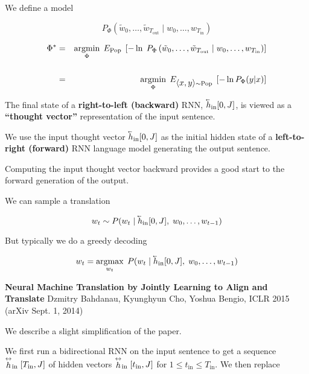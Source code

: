 {

\vfill
We define a model

\vfill
$$P_\Phi\left(\tilde{w}_0,\ldots,\tilde{w}_{T_{\mathrm{out}}}\;|\; w_0,\ldots,w_{T_{\mathrm{in}}}\right)$$

\vfill
\begin{eqnarray*}
\Phi^*  & = & \operatorname*{argmin}_\Phi\; E_{\mathrm{Pop}} \;\left[-\ln\;P_\Phi\left(\tilde{w}_0,\ldots,\tilde{w}_{T_{\mathrm{out}}}\;|\; w_0,\ldots,w_{T_{\mathrm{in}}}\right)\right] \\
\\
& = & \operatorname*{argmin}_\Phi \; E_{{\mbox{$\langle x,y\rangle$}} \sim \mathrm{Pop}} \; \left[-\ln P_\Phi(y|x)\right]
\end{eqnarray*}


\vfill
The final state of a {\bf right-to-left (backward)} RNN, $\cev{h}_{\mathrm{in}}[0,J]$, is viewed as a {\bf ``thought vector''} representation of the input sentence.

\vfill
We use the input thought vector $\cev{h}_{\mathrm{in}}[0,J]$ as the initial hidden state of a {\bf left-to-right (forward)} RNN language model
generating the output sentence.

\vfill
Computing the input thought vector backward provides a good start to the forward generation of the output.


We can sample a translation

$$w_t \sim P(w_t\;|\;\cev{h}_{\mathrm{in}}[0,J],\;w_0,\ldots,w_{t-1})$$

\vfill
But typically we do a greedy decoding

$$w_t = \argmax_{w_t}\; P(w_t\;|\;\cev{h}_{\mathrm{in}}[0,J],\;w_0,\ldots,w_{t-1})$$


{\bf Neural Machine Translation by Jointly Learning to {\color{red} Align} and Translate}
Dzmitry Bahdanau, Kyunghyun Cho, Yoshua Bengio, ICLR 2015 (arXiv Sept. 1, 2014)

\vfill
We describe a slight simplification of the paper.

We first run a bidirectional RNN on the
input sentence to get a {\color{red} sequence} $\stackrel{\leftrightarrow}{h}_\mathrm{in}[T_{\mathrm{in}},J]$ of hidden vectors $\stackrel{\leftrightarrow}{h}_\mathrm{in}[t_\mathrm{in},J]$ for $1 \leq t_\mathrm{in} \leq T_{\mathrm{in}}$.
We then replace

}
